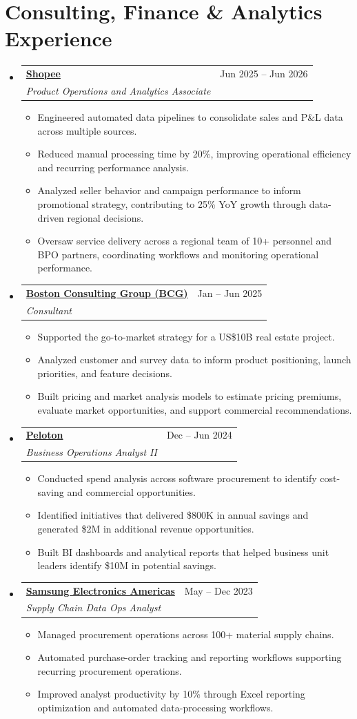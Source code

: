 \documentclass[a4paper,10pt]{article}
\makeatletter
\newcommand{\resumeItem}[1]{
  \item\small{{#1 \vspace{-2pt}}}
}
\newcommand{\resumeSubheading}[4]{
  \vspace{-2pt}\item
    \begin{tabular*}{0.97\textwidth}[t]{l@{\extracolsep{\fill}}r}
      \small\textbf{#1} & \small #2 \\
      \textit{\small #3} & \textit{\small #4} \\
    \end{tabular*}\vspace{-7pt}
}
\newcommand{\resumeSubHeadingListStart}{\begin{itemize}[leftmargin=0.15in,label={}]}
\newcommand{\resumeSubHeadingListEnd}{\end{itemize}}
\newcommand{\resumeItemListStart}{\begin{itemize}[leftmargin=0.22in]}
\newcommand{\resumeItemListEnd}{\end{itemize}\vspace{-5pt}}
\makeatother
\begin{document}
\section{Consulting, Finance \& Analytics Experience}
\resumeSubHeadingListStart
  \resumeSubheading
    {\href{https://www.sea.com/products/shopee}{Shopee}}{Jun 2025 -- Jun 2026}
    {Product Operations and Analytics Associate}{}
    \resumeItemListStart
      \resumeItem{Engineered automated data pipelines to consolidate sales and P\&L data across multiple sources.}
      \resumeItem{Reduced manual processing time by 20\%, improving operational efficiency and recurring performance analysis.}
      \resumeItem{Analyzed seller behavior and campaign performance to inform promotional strategy, contributing to 25\% YoY growth through data-driven regional decisions.}
      \resumeItem{Oversaw service delivery across a regional team of 10+ personnel and BPO partners, coordinating workflows and monitoring operational performance.}
    \resumeItemListEnd
  \resumeSubheading
    {\href{https://www.bcg.com/about/overview}{Boston Consulting Group (BCG)}}{Jan -- Jun 2025}
    {Consultant}{}
    \resumeItemListStart
      \resumeItem{Supported the go-to-market strategy for a US\$10B real estate project.}
      \resumeItem{Analyzed customer and survey data to inform product positioning, launch priorities, and feature decisions.}
      \resumeItem{Built pricing and market analysis models to estimate pricing premiums, evaluate market opportunities, and support commercial recommendations.}
    \resumeItemListEnd
  \resumeSubheading
    {\href{https://www.onepeloton.com/company}{Peloton}}{Dec -- Jun 2024}
    {Business Operations Analyst II}{}
    \resumeItemListStart
      \resumeItem{Conducted spend analysis across software procurement to identify cost-saving and commercial opportunities.}
      \resumeItem{Identified initiatives that delivered \$800K in annual savings and generated \$2M in additional revenue opportunities.}
      \resumeItem{Built BI dashboards and analytical reports that helped business unit leaders identify \$10M in potential savings.}
    \resumeItemListEnd
  \resumeSubheading
    {\href{https://www.samsung.com/us/about-us/our-business/}{Samsung Electronics Americas}}{May -- Dec 2023}
    {Supply Chain Data Ops Analyst}{}
    \resumeItemListStart
      \resumeItem{Managed procurement operations across 100+ material supply chains.}
      \resumeItem{Automated purchase-order tracking and reporting workflows supporting recurring procurement operations.}
      \resumeItem{Improved analyst productivity by 10\% through Excel reporting optimization and automated data-processing workflows.}
    \resumeItemListEnd
\resumeSubHeadingListEnd
\end{document}
